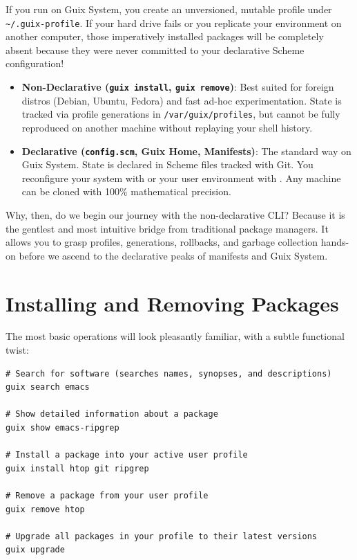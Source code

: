 If you run  on Guix System, you create an unversioned, mutable profile under \texttt{\textasciitilde/.guix-profile}. If your hard drive fails or you replicate your environment on another computer, those imperatively installed packages will be completely absent because they were never committed to your declarative Scheme configuration!

\begin{alchemybox}
\begin{itemize}
  \item \textbf{Non-Declarative (\texttt{guix install}, \texttt{guix remove})}:
  Best suited for foreign distros (Debian, Ubuntu, Fedora) and fast ad-hoc experimentation. State is tracked via profile generations in \texttt{/var/guix/profiles}, but cannot be fully reproduced on another machine without replaying your shell history.
  \item \textbf{Declarative (\texttt{config.scm}, Guix Home, Manifests)}:
  The standard way on Guix System. State is declared in Scheme files tracked with Git. You reconfigure your system with  or your user environment with . Any machine can be cloned with 100\% mathematical precision.
\end{itemize}
\end{alchemybox}

Why, then, do we begin our journey with the non-declarative CLI? Because it is the gentlest and most intuitive bridge from traditional package managers. It allows you to grasp profiles, generations, rollbacks, and garbage collection hands-on before we ascend to the declarative peaks of manifests and Guix System.

\section{Installing and Removing Packages}

The most basic operations will look pleasantly familiar, with a subtle functional twist:

\begin{lstlisting}[style=guixcli]
# Search for software (searches names, synopses, and descriptions)
guix search emacs

# Show detailed information about a package
guix show emacs-ripgrep

# Install a package into your active user profile
guix install htop git ripgrep

# Remove a package from your user profile
guix remove htop

# Upgrade all packages in your profile to their latest versions
guix upgrade
\end{lstlisting}

